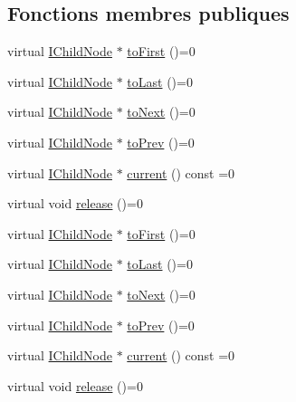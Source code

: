 \subsection*{Fonctions membres publiques}
\begin{DoxyCompactItemize}
\item 
virtual \hyperlink{class_i_child_node}{I\+Child\+Node} $\ast$ \hyperlink{class_i_child_node_iterator_a7c8f9cf939df05325d0a0d792ab146ea}{to\+First} ()=0
\item 
virtual \hyperlink{class_i_child_node}{I\+Child\+Node} $\ast$ \hyperlink{class_i_child_node_iterator_a015ee0f278ebd14a7de10f1fda18f6b3}{to\+Last} ()=0
\item 
virtual \hyperlink{class_i_child_node}{I\+Child\+Node} $\ast$ \hyperlink{class_i_child_node_iterator_a7b84531dde02554cc105b0cbaea84b7a}{to\+Next} ()=0
\item 
virtual \hyperlink{class_i_child_node}{I\+Child\+Node} $\ast$ \hyperlink{class_i_child_node_iterator_ae11de8e2b0d849b41d3608258a88b332}{to\+Prev} ()=0
\item 
virtual \hyperlink{class_i_child_node}{I\+Child\+Node} $\ast$ \hyperlink{class_i_child_node_iterator_a0f819f33385f07b4aac98cd9d511ebdf}{current} () const  =0
\item 
virtual void \hyperlink{class_i_child_node_iterator_a85114d69ba9f1d47e87208aaf72b91ab}{release} ()=0
\item 
virtual \hyperlink{class_i_child_node}{I\+Child\+Node} $\ast$ \hyperlink{class_i_child_node_iterator_a7c8f9cf939df05325d0a0d792ab146ea}{to\+First} ()=0
\item 
virtual \hyperlink{class_i_child_node}{I\+Child\+Node} $\ast$ \hyperlink{class_i_child_node_iterator_a015ee0f278ebd14a7de10f1fda18f6b3}{to\+Last} ()=0
\item 
virtual \hyperlink{class_i_child_node}{I\+Child\+Node} $\ast$ \hyperlink{class_i_child_node_iterator_a7b84531dde02554cc105b0cbaea84b7a}{to\+Next} ()=0
\item 
virtual \hyperlink{class_i_child_node}{I\+Child\+Node} $\ast$ \hyperlink{class_i_child_node_iterator_ae11de8e2b0d849b41d3608258a88b332}{to\+Prev} ()=0
\item 
virtual \hyperlink{class_i_child_node}{I\+Child\+Node} $\ast$ \hyperlink{class_i_child_node_iterator_a0f819f33385f07b4aac98cd9d511ebdf}{current} () const  =0
\item 
virtual void \hyperlink{class_i_child_node_iterator_a85114d69ba9f1d47e87208aaf72b91ab}{release} ()=0
\end{DoxyCompactItemize}


